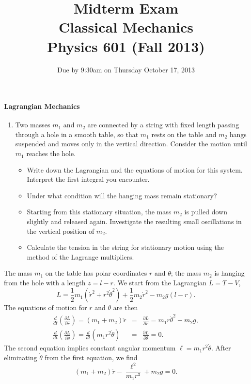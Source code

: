 \documentclass[letterpaper,11pt]{article}
\title{Midterm Exam \\ Classical Mechanics \\ Physics 601 (Fall 2013)}
\date{Due by 9:30am on Thursday October 17, 2013}
\begin{document}
\maketitle

\paragraph*{Lagrangian Mechanics}
\begin{enumerate}
 \item Two masses $m_1$ and $m_2$ are connected by a string with fixed length passing through a hole in a smooth table, so that $m_1$ rests on the table and $m_2$ hangs suspended and moves only in the vertical direction.  Consider the motion until $m_1$ reaches the hole.
 \begin{itemize}
  \item Write down the Lagrangian and the equations of motion for this system. Interpret the first integral you encounter.
  \item Under what condition will the hanging mass remain stationary?
  \item Starting from this stationary situation, the mass $m_2$ is pulled down slightly and released again. Investigate the resulting small oscillations in the vertical position of $m_2$.
  \item Calculate the tension in the string for stationary motion using the method of the Lagrange multipliers.
 \end{itemize}
\end{enumerate}

The mass $m_1$ on the table has polar coordinates $r$ and $\theta$; the mass $m_2$ is hanging from the hole with a length $z = l - r$.  We start from the Lagrangian $L = T - V$,
\begin{equation*}
 L = \frac{1}{2} m_1 (\dot{r}^2 + r^2 \dot{\theta}^2) + \frac{1}{2} m_2 \dot{r}^2 - m_2 g (l - r).
\end{equation*}
The equations of motion for $r$ and $\theta$ are then
\begin{eqnarray*}
 \frac{d}{dt} \left( \frac{\partial L}{\partial \dot{r}} \right) = (m_1 + m_2) \ddot{r} & = & \frac{\partial L}{\partial r} = m_1 r \dot{\theta}^2 + m_2 g, \\
 \frac{d}{dt} \left( \frac{\partial L}{\partial \dot{\theta}} \right) = \frac{d}{dt} \left( m_1 r^2 \dot{\theta} \right) & =  & \frac{\partial L}{\partial \theta} = 0.
\end{eqnarray*}
The second equation implies constant angular momentum $\ell = m_1 r^2 \dot{\theta}$.  After eliminating $\dot{\theta}$ from the first equation, we find
\begin{equation*}
 (m_1 + m_2) \ddot{r} - \frac{\ell^2}{m_1 r^3} + m_2 g = 0.
\end{equation*}
\end{document}

